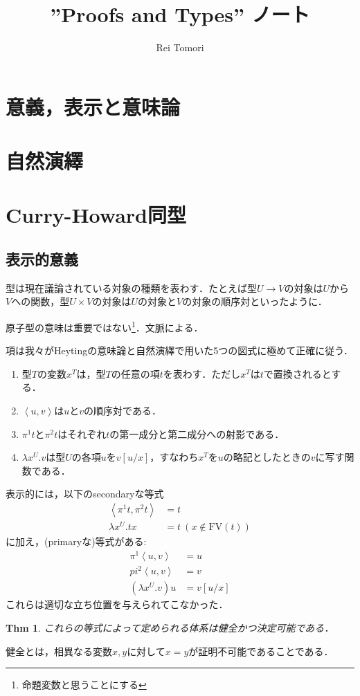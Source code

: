 \documentclass[a4paper,10pt,platex, dvipdfmx]{jsarticle}
\title{''Proofs and Types'' ノート}
\author{Rei Tomori}
\newtheorem{thm}{Thm}
\begin{document}
\maketitle
\section{意義，表示と意味論}
\section{自然演繹}
\section{Curry-Howard同型}
\subsection{表示的意義}
型は現在議論されている対象の種類を表わす．たとえば型$U \to V$の対象は$U$から$V$への関数，型$U\times V$の対象は$U$の対象と$V$の対象の順序対といったように．

原子型の意味は重要ではない\footnote{命題変数と思うことにする}．文脈による．

項は我々がHeytingの意味論と自然演繹で用いた5つの図式に極めて正確に従う．\begin{enumerate}
\item 型$T$の変数$x^{T}$は，型$T$の任意の項$t$を表わす．ただし$x^{T}$は$t$で置換されるとする．
\item $\left<u, v\right>$は$u$と$v$の順序対である．
\item $\pi^{1}t$と$\pi^{2}t$はそれぞれ$t$の第一成分と第二成分への射影である．
\item $\lambda x^{U}. v$は型$U$の各項$u$を$v\left[u/ x\right]$，すなわち$x^{T}$を$u$の略記としたときの$v$に写す関数である．
\end{enumerate}
表示的には，以下のsecondaryな等式
\begin{align}
\nonumber
\left<\pi^{1}t, \pi^{2}t\right> &= t\\
\nonumber
\lambda x^{U} . t x & = t\ (x\notin\mathrm{FV}(t))
\end{align}に加え，(primaryな)等式がある:\begin{align}
    \nonumber
\pi^{1}\left<u, v\right> &= u\\
\label{eqn:1}
pi^{2}\left<u, v\right> &= v\\
\nonumber
(\lambda x^{U}. v) u &= v\left[u/x\right]
\end{align}
これらは適切な立ち位置を与えられてこなかった．
\begin{thm}
    これらの等式によって定められる体系は健全かつ決定可能である．
\end{thm}
健全とは，相異なる変数$x, y$に対して$x = y$が証明不可能であることである．
\end{document}
